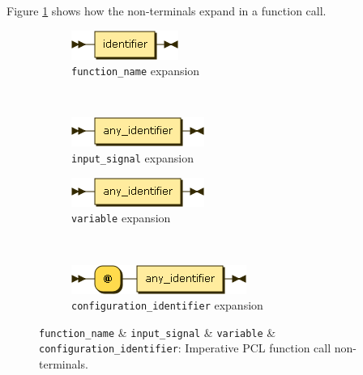 Figure \ref{fig:imperative-pcl-function-call-non-terminals} shows how the non-terminals expand in a function call.
\begin{figure}[h!]
  \centering
  \begin{subfigure}[b]{0.4\textwidth}
    \includegraphics[scale=\DiagramScale]{chapters/adapter/diagrams/function_name}
    \caption{\texttt{function\_name} expansion}
  \end{subfigure}
  ~
  \begin{subfigure}[b]{0.4\textwidth}
    \includegraphics[scale=\DiagramScale]{chapters/adapter/diagrams/input_signal}
    \caption{\texttt{input\_signal} expansion}
  \end{subfigure}

  \begin{subfigure}[b]{0.4\textwidth}
    \includegraphics[scale=\DiagramScale]{chapters/adapter/diagrams/variable}
    \caption{\texttt{variable} expansion}
  \end{subfigure}
  ~
  \begin{subfigure}[b]{0.4\textwidth}
    \includegraphics[scale=\DiagramScale]{chapters/adapter/diagrams/configuration_identifier}
    \caption{\texttt{configuration\_identifier} expansion}
  \end{subfigure}
  \caption{\texttt{function\_name} \& \texttt{input\_signal} \& \texttt{variable} \& \texttt{configuration\_identifier}: Imperative PCL function call non-terminals.}
  \label{fig:imperative-pcl-function-call-non-terminals}
\end{figure}

\clearpage

